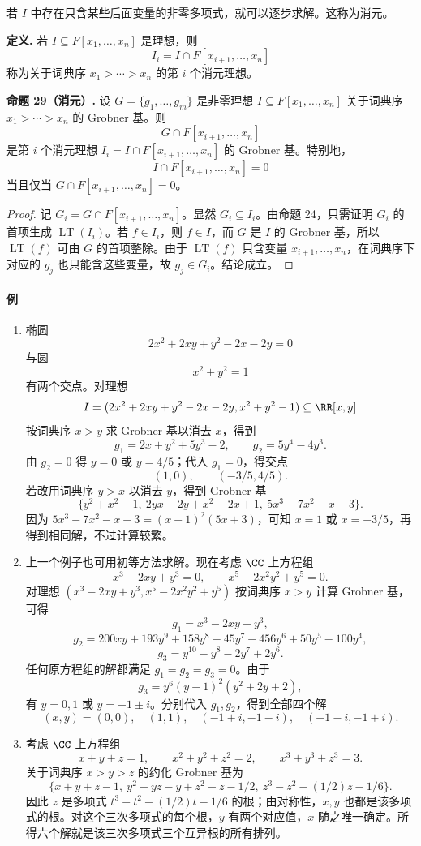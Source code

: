 若 $I$ 中存在只含某些后面变量的非零多项式，就可以逐步求解。这称为消元。

\noindent\textbf{定义.} 若 $I\subseteq F[x_1,
\ldots,x_n]$ 是理想，则
\[
I_i=I\cap F[x_{i+1},\ldots,x_n]
\]
称为关于词典序 $x_1>\cdots>x_n$ 的第 $i$ 个消元理想。

\noindent\textbf{命题 29（消元）.} 设 $G=\{g_1,\ldots,g_m\}$ 是非零理想 $I\subseteq F[x_1,\ldots,x_n]$ 关于词典序 $x_1>\cdots>x_n$ 的 Grobner 基。则
\[
G\cap F[x_{i+1},\ldots,x_n]
\]
是第 $i$ 个消元理想 $I_i=I\cap F[x_{i+1},\ldots,x_n]$ 的 Grobner 基。特别地，
\[
I\cap F[x_{i+1},\ldots,x_n]=0
\]
当且仅当 $G\cap F[x_{i+1},\ldots,x_n]=0$。

\begin{proof}
	记 $G_i=G\cap F[x_{i+1},\ldots,x_n]$。显然 $G_i\subseteq I_i$。由命题 24，只需证明 $G_i$ 的首项生成 $\operatorname{LT}(I_i)$。若 $f\in I_i$，则 $f\in I$，而 $G$ 是 $I$ 的 Grobner 基，所以 $\operatorname{LT}(f)$ 可由 $G$ 的首项整除。由于 $\operatorname{LT}(f)$ 只含变量 $x_{i+1},\ldots,x_n$，在词典序下对应的 $g_j$ 也只能含这些变量，故 $g_j\in G_i$。结论成立。
\end{proof}

\paragraph{例}
\begin{enumerate}[label=(\arabic*)]
	\item 椭圆
\[
2x^2+2xy+y^2-2x-2y=0
\]
与圆
\[
x^2+y^2=1
\]
有两个交点。对理想
\[
I=(2x^2+2xy+y^2-2x-2y,
x^2+y^2-1)\subseteq\RR[x,y]
\]
按词典序 $x>y$ 求 Grobner 基以消去 $x$，得到
\[
g_1=2x+y^2+5y^3-2,
\qquad g_2=5y^4-4y^3.
\]
由 $g_2=0$ 得 $y=0$ 或 $y=4/5$；代入 $g_1=0$，得交点
\[
(1,0),
\qquad (-3/5,4/5).
\]
若改用词典序 $y>x$ 以消去 $y$，得到 Grobner 基
\[
\{y^2+x^2-1,
\ 2yx-2y+x^2-2x+1,
\ 5x^3-7x^2-x+3\}.
\]
因为 $5x^3-7x^2-x+3=(x-1)^2(5x+3)$，可知 $x=1$ 或 $x=-3/5$，再得到相同解，不过计算较繁。
	\item 上一个例子也可用初等方法求解。现在考虑 $\CC$ 上方程组
\[
x^3-2xy+y^3=0,
\qquad
x^5-2x^2y^2+y^5=0.
\]
对理想 $(x^3-2xy+y^3,
 x^5-2x^2y^2+y^5)$ 按词典序 $x>y$ 计算 Grobner 基，可得
\[
g_1=x^3-2xy+y^3,
\]
\[
g_2=200xy+193y^9+158y^8-45y^7-456y^6+50y^5-100y^4,
\]
\[
g_3=y^{10}-y^8-2y^7+2y^6.
\]
任何原方程组的解都满足 $g_1=g_2=g_3=0$。由于
\[
g_3=y^6(y-1)^2(y^2+2y+2),
\]
有 $y=0,1$ 或 $y=-1\pm i$。分别代入 $g_1,g_2$，得到全部四个解
\[
(x,y)=(0,0),
\quad (1,1),
\quad (-1+i,-1-i),
\quad (-1-i,-1+i).
\]
	\item 考虑 $\CC$ 上方程组
\[
x+y+z=1,
\qquad x^2+y^2+z^2=2,
\qquad x^3+y^3+z^3=3.
\]
关于词典序 $x>y>z$ 的约化 Grobner 基为
\[
\{x+y+z-1,
\ y^2+yz-y+z^2-z-1/2,
\ z^3-z^2-(1/2)z-1/6\}.
\]
因此 $z$ 是多项式 $t^3-t^2-(1/2)t-1/6$ 的根；由对称性，$x,y$ 也都是该多项式的根。对这个三次多项式的每个根，$y$ 有两个对应值，$x$ 随之唯一确定。所得六个解就是该三次多项式三个互异根的所有排列。
\end{enumerate}

